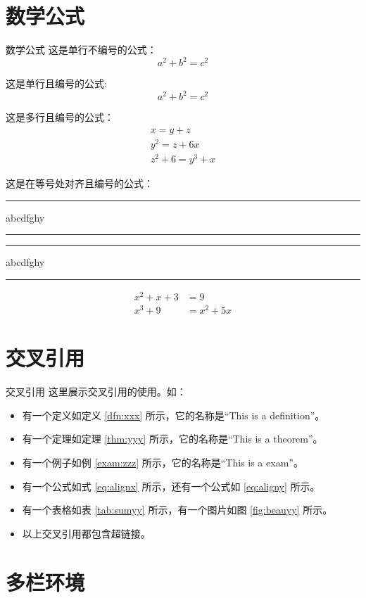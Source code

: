 \documentclass[compress,10pt,dvipsnames,notheorems]{beamer} %
\begin{document}
\section{数学公式}%
\begin{frame}{数学公式}
	这是单行不编号的公式：
	\[ a^2 + b^2 = c^2 \]
	
	这是单行且编号的公式:
	\begin{equation}
		a^2 + b^2 = c^2
	\end{equation}

	这是多行且编号的公式：
	\begin{gather}
		x = y + z \\
		y^2 = z + 6x \\
		z^2 + 6 = y^3 + x
	\end{gather}
	
	这是在等号处对齐且编号的公式： \rule{1pt}{1em}abcdfghy\rule{1pt}{2em} \rule[-1em]{1pt}{1em}abcdfghy\rule[-0.5em]{1pt}{1em}
	\begin{align}
		x^2 + x + 3 &= 9 \label{eq:alignx} \\
		x^3 + 9 &= x^2 + 5x \label{eq:aligny}
	\end{align}	
\end{frame}

\section{交叉引用}

\begin{frame}{交叉引用}
	这里展示交叉引用的使用。如：
	\begin{itemize}
		\item 有一个定义如定义 \ref{dfn:xxx} 所示，它的名称是“This is a definition”。
		\item 有一个定理如定理 \ref{thm:yyy} 所示，它的名称是“This is a theorem”。
		\item 有一个例子如例 \ref{exam:zzz} 所示，它的名称是“This is a exam”。
		\item 有一个公式如式 \eqref{eq:alignx} 所示，还有一个公式如 \eqref{eq:aligny} 所示。
		\item 有一个表格如表 \ref{tab:sumyy} 所示，有一个图片如图 \ref{fig:beauyy} 所示。
		\item 以上交叉引用都包含超链接。
	\end{itemize}
\end{frame}

\section{多栏环境}%
\end{document}
